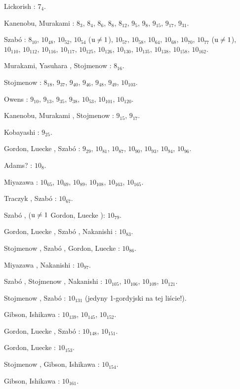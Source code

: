 \begin{compactitem}
\item Lickorish \cite{lickorish85}: $7_{4}$.
\item Kanenobu, Murakami \cite{kanenobumurakami86}: $8_{3}$, $8_{4}$, $8_{6}$, $8_{8}$, $8_{12}$, $9_{5}$, $9_{8}$, $9_{15}$, $9_{17}$, $9_{31}$.
\item Szabó \cite{szabo05}: $8_{10}$, $10_{48}$, $10_{52}$, $10_{54}$ ($\operatorname{u} \neq 1$), $10_{57}$, $10_{58}$, $10_{64}$, $10_{68}$, $10_{70}$, $10_{77}$ ($\operatorname{u} \neq 1$), $10_{110}$, $10_{112}$, $10_{116}$, $10_{117}$, $10_{125}$, $10_{126}$, $10_{130}$, $10_{135}$, $10_{138}$, $10_{158}$, $10_{162}$.
\item Murakami, Yasuhara \cite{yasuhara00}, Stojmenow \cite{stoimenow04}: $8_{16}$.
\item Stojmenow \cite{stoimenow04}: $8_{18}$, $9_{37}$, $9_{40}$, $9_{46}$, $9_{48}$, $9_{49}$, $10_{103}$.
\item Owens \cite{owens08}: $9_{10}$, $9_{13}$, $9_{35}$, $9_{38}$, $10_{53}$, $10_{101}$, $10_{120}$.
\item Kanenobu, Murakami \cite{kanenobumurakami86}, Stojmenow \cite{stoimenow04}: $9_{15}$, $9_{17}$.
\item Kobayashi \cite{kobayashi89}: $9_{25}$.
\item Gordon, Luecke \cite{gordon06}, Szabó \cite{szabo05}: $9_{29}$, $10_{81}$, $10_{87}$, $10_{90}$, $10_{93}$, $10_{94}$, $10_{96}$.
\item Adams? \cite[s. 62]{adams94}: $10_{8}$.
\item Miyazawa \cite{miyazawa98}: $10_{65}$, $10_{69}$, $10_{89}$, $10_{108}$, $10_{163}$, $10_{165}$.
\item Traczyk \cite{traczyk99}, Szabó \cite{szabo05}: $10_{67}$.
\item Szabó \cite{szabo05}, ($\operatorname{u} \neq 1$ Gordon, Luecke \cite{gordon06}): $10_{79}$.
\item Gordon, Luecke \cite{gordon06}, Szabó \cite{szabo05}, Nakanishi \cite{nakanishi05}: $10_{83}$.
\item Stojmenow \cite{stoimenow04}, Szabó \cite{szabo05}, Gordon, Luecke \cite{gordon06}: $10_{86}$.
\item Miyazawa \cite{miyazawa98}, Nakanishi \cite{nakanishi05}: $10_{97}$.
\item Szabó \cite{szabo05}, Stojmenow \cite{stoimenow04}, Nakanishi \cite{nakanishi05}: $10_{105}$, $10_{106}$, $10_{109}$, $10_{121}$.
\item Stojmenow \cite{stoimenow04}, Szabó \cite{szabo05}: $10_{131}$ (jedyny 1-gordyjski na tej liście!).
\item Gibson, Ishikawa \cite{ishikawa02}: $10_{139}$, $10_{145}$, $10_{152}$.
\item Gordon, Luecke \cite{gordon06}, Szabó \cite{szabo05}: $10_{148}$, $10_{151}$.
\item Gordon, Luecke \cite{gordon06}: $10_{153}$.
\item Stojmenow \cite{stoimenow03}, Gibson, Ishikawa \cite{ishikawa02}: $10_{154}$.
\item Gibson, Ishikawa \cite{ishikawa02}: $10_{161}$.
\end{compactitem}

